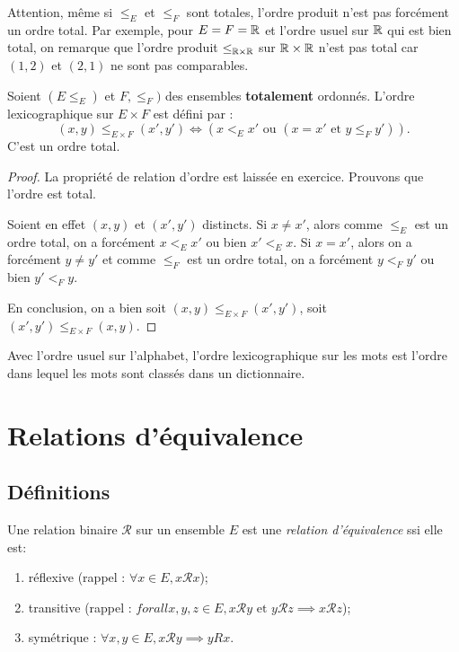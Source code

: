 Attention, même si $\leq_E$ et $\leq_F$ sont totales, l'ordre produit n'est pas forcément un ordre total. Par exemple, pour $E=F=\mathbb{R}$ et l'ordre usuel sur $\mathbb{R}$ qui est bien total, on remarque que l'ordre produit $\leq_{\mathbb{R}\times\mathbb{R}}$ sur $\mathbb{R}\times \mathbb{R}$ n'est pas total car $(1,2)$ et $(2,1)$ ne sont pas comparables.

\begin{propdef}
Soient $(E\leq_E)$ et $F,\leq_F)$ des ensembles \textbf{totalement} ordonnés.
L'ordre lexicographique sur $E\times F$ est défini par :
\[
(x,y) \leq_{E\times F} (x',y') \iff \left(x<_E x' \text{ ou } (x=x' \text{ et } y\leq_F y')\right).
\]
C'est un ordre total.
\end{propdef}
\begin{proof}
La propriété de relation d'ordre est laissée en exercice. Prouvons que l'ordre est total.

Soient en effet $(x,y)$ et $(x',y')$ distincts.
Si $x\neq x'$, alors comme $\leq_E$ est un ordre total, on a forcément $x<_E x'$ ou bien $x'<_E x$.
Si $x=x'$, alors on a forcément $y\neq y'$ et comme $\leq_F$ est un ordre total, on a forcément $y <_F y'$ ou bien $y'<_F y$.

En conclusion, on a bien soit $(x,y) \leq_{E\times F} (x',y')$, soit  $(x',y') \leq_{E\times F} (x,y)$.
\end{proof}

\begin{exemple}Avec l'ordre usuel sur l'alphabet, l'ordre lexicographique sur les mots est l'ordre dans lequel les mots sont classés dans un dictionnaire.
\end{exemple}



\section{Relations d'équivalence}

\subsection{Définitions}

\begin{definition}
Une relation binaire ${\mathcal R}$ sur un ensemble $E$ est une \emph{relation d'équivalence} ssi elle est:
\begin{enumerate}
\item réflexive (rappel : $\forall x\in E, x{\mathcal R}x$);
\item transitive (rappel : $forallx, y, z\in E, x{\mathcal R}y\text{ et } y{\mathcal R}z \implies x{\mathcal R}z$);
\item symétrique : $\forall x, y\in E, x{\mathcal R}y \implies yRx$.
\end{enumerate}
\end{definition}

